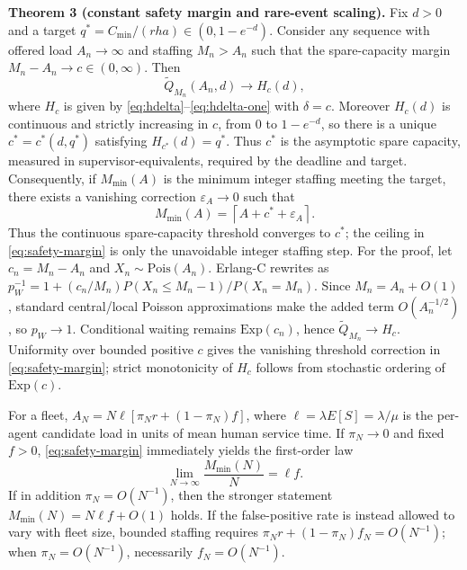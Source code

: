 \documentclass[letterpaper,10pt,conference]{ieeeconf}
\begin{document}
\textbf{Theorem 3 (constant safety margin and rare-event scaling).}
Fix $d>0$ and a target
$q^*=C_{\min}/(rha)\in(0,1-e^{-d})$. Consider any sequence with offered load
$A_n\to\infty$ and staffing $M_n>A_n$ such that the spare-capacity margin
$M_n-A_n\to c\in(0,\infty)$. Then
\begin{equation}
\widetilde Q_{M_n}(A_n,d)\longrightarrow H_c(d),
\label{eq:constant-margin}
\end{equation}
where $H_c$ is given by \eqref{eq:hdelta}--\eqref{eq:hdelta-one} with
$\delta=c$. Moreover $H_c(d)$ is continuous
and strictly increasing in $c$, from $0$ to $1-e^{-d}$, so there is a unique
$c^*=c^*(d,q^*)$ satisfying $H_{c^*}(d)=q^*$. Thus $c^*$ is the asymptotic
spare capacity, measured in supervisor-equivalents, required by the deadline
and target. Consequently, if $M_{\min}(A)$ is the minimum integer staffing meeting the
target, there exists a vanishing correction \(\varepsilon_A\to0\) such that
\begin{equation}
M_{\min}(A)=\left\lceil A+c^*+\varepsilon_A\right\rceil.
\label{eq:safety-margin}
\end{equation}
Thus the continuous spare-capacity threshold converges to \(c^*\); the ceiling
in \eqref{eq:safety-margin} is only the unavoidable integer staffing step.
For the proof, let \(c_n=M_n-A_n\) and \(X_n\sim\mathrm{Pois}(A_n)\).
Erlang-C rewrites as
\(p_W^{-1}=1+(c_n/M_n)P(X_n\le M_n-1)/P(X_n=M_n)\). Since
\(M_n=A_n+O(1)\), standard central/local Poisson approximations make the
added term \(O(A_n^{-1/2})\), so \(p_W\to1\). Conditional waiting remains
\(\mathrm{Exp}(c_n)\), hence \(\widetilde Q_{M_n}\to H_c\). Uniformity
over bounded positive \(c\) gives the vanishing threshold correction in
\eqref{eq:safety-margin}; strict monotonicity of \(H_c\) follows from
stochastic ordering of \(\mathrm{Exp}(c)\).

For a fleet,
$A_N=N\ell[\pi_Nr+(1-\pi_N)f]$, where
$\ell=\lambda E[S]=\lambda/\mu$ is the per-agent candidate load in units of
mean human service time. If $\pi_N\to0$ and fixed $f>0$,
\eqref{eq:safety-margin} immediately yields the first-order law
\begin{equation}
\lim_{N\to\infty}\frac{M_{\min}(N)}{N}=\ell f.
\label{eq:staffing-law}
\end{equation}
If in addition $\pi_N=O(N^{-1})$, then the stronger statement
$M_{\min}(N)=N\ell f+O(1)$ holds. If the false-positive rate is instead
allowed to vary with fleet size, bounded staffing requires
$\pi_Nr+(1-\pi_N)f_N=O(N^{-1})$; when $\pi_N=O(N^{-1})$, necessarily
$f_N=O(N^{-1})$.
\end{document}
